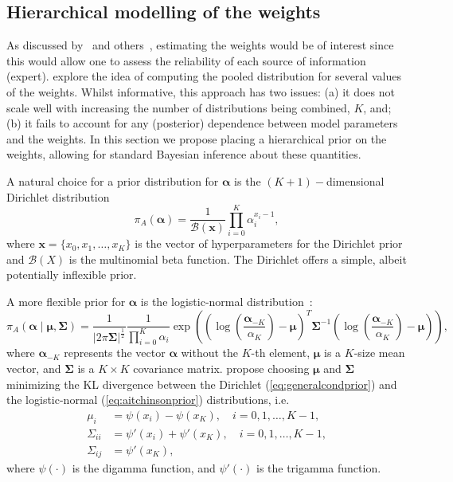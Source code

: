 \documentclass[a4paper, notitlepage, 11pt]{article}
\begin{document}
\subsection{Hierarchical modelling of the weights}
\label{sec:hierPrior}

As discussed by~\cite{Poole2000} and others~\citep{Zhong2015,Li2017}, estimating the weights would be of interest since this would allow one to assess the reliability of each source of information (expert).
\cite{Li2017} explore the idea of computing the pooled distribution for several values of the weights.
Whilst informative, this approach has two issues: (a) it does not scale well with increasing the number of distributions being combined, $K$, and; (b) it fails to account for any (posterior) dependence between model parameters and the weights.
In this section we propose placing a hierarchical prior on the weights, allowing for standard Bayesian inference about these quantities.

A natural choice for a prior distribution for $\boldsymbol\alpha$ is the $(K+1)-$dimensional Dirichlet distribution
\begin{equation}
 \label{eq:generalcondprior}
 \pi_A(\boldsymbol\alpha) = \frac{1}{\mathcal{B}(\boldsymbol x)}\prod_{i=0}^K \alpha_i^{x_i-1},
\end{equation}
where $\boldsymbol x = \{ x_0, x_1, \ldots, x_K\}$ is the vector of hyperparameters for the Dirichlet prior and $\mathcal{B}(X)$ is the multinomial beta function.
The Dirichlet offers a simple, albeit potentially inflexible prior.

A more flexible prior for $\boldsymbol\alpha$ is the logistic-normal distribution~\citep{Aitchson1980}:
\begin{equation}
 \label{eq:aitchinsonprior}
 \pi_A(\boldsymbol\alpha \mid \boldsymbol \mu, \boldsymbol \Sigma) = \frac{1}{|2\pi \boldsymbol \Sigma|^{\frac{1}{2}}}\frac{1}{\prod_{i=0}^K \alpha_i}
  \exp\left(
     \left(\log\left(\frac{\boldsymbol \alpha_{-K}}{\alpha_K}\right) - \boldsymbol \mu\right)^T
     {\boldsymbol \Sigma}^{-1}
     \left(\log\left(\frac{\boldsymbol \alpha_{-K}}{\alpha_K}\right) - \boldsymbol \mu\right)
     \right),
\end{equation}
where $\boldsymbol \alpha_{-K}$ represents the vector $\boldsymbol \alpha$ without the $K$-th element, $\boldsymbol \mu$ is a $K$-size mean vector, and $\boldsymbol \Sigma$ is a $K \times K$ covariance matrix.
\citep{Aitchson1980} propose choosing $\boldsymbol \mu$ and $\boldsymbol \Sigma$ minimizing the KL divergence between the Dirichlet (\ref{eq:generalcondprior}) and the logistic-normal (\ref{eq:aitchinsonprior}) distributions, i.e.
\begin{align}
 \label{eq:momentmatching}
 \mu_i & = \psi(x_i) - \psi(x_K), \quad i=0,1,\ldots,K-1, \\
 \Sigma_{ii} & = \psi'(x_i) + \psi'(x_K), \quad i=0,1,\ldots,K-1, \\
 \Sigma_{ij} & = \psi'(x_K),
\end{align}
where $\psi(\cdot)$ is the digamma function, and $\psi'(\cdot)$ is the trigamma function.
\end{document}
